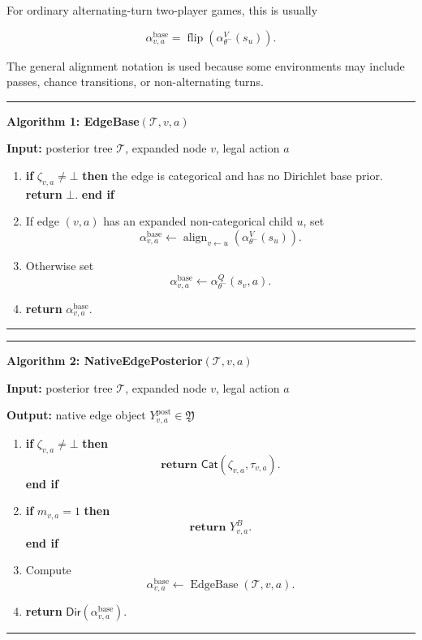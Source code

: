 \documentclass[11pt]{article}
\newcommand{\Tree}{\mathcal{T}}
\newcommand{\Flip}{\operatorname{flip}}
\newcommand{\Align}{\operatorname{align}}
\newcommand{\EdgeBase}{\operatorname{EdgeBase}}
\newcommand{\Native}{\mathfrak{Y}}
\newcommand{\DirObj}{\mathsf{Dir}}
\newcommand{\CatObj}{\mathsf{Cat}}
\newenvironment{algorithmblock}[1]
{
  \par\medskip
  \noindent\hrule\par\smallskip
  \noindent\textbf{#1}
  \par\smallskip
}
{
  \par\smallskip\noindent\hrule\par\medskip
}
\newcommand{\Input}{\textbf{Input: }}
\newcommand{\Output}{\textbf{Output: }}
\newcommand{\Return}{\textbf{return }}
\newcommand{\If}{\textbf{if }}
\newcommand{\Then}{\textbf{ then }}
\newcommand{\EndIf}{\textbf{end if}}
\begin{document}
For ordinary alternating-turn two-player games, this is usually

\[
\alpha^{\mathrm{base}}_{v,a}
=
\Flip
\left(
\alpha_{\theta^-}^V(s_u)
\right).
\]

The general alignment notation is used because some environments may include
passes, chance transitions, or non-alternating turns.

\begin{algorithmblock}{Algorithm 1: EdgeBase\((\Tree,v,a)\)}

\Input posterior tree \(\Tree\), expanded node \(v\), legal action \(a\)

\begin{enumerate}[leftmargin=2em]
  \item \If \(\zeta_{v,a}\ne\bot\) \Then the edge is categorical and has no
  Dirichlet base prior. \Return \(\bot\). \EndIf

  \item If edge \((v,a)\) has an expanded non-categorical child \(u\), set
  \[
  \alpha^{\mathrm{base}}_{v,a}
  \gets
  \Align_{v \leftarrow u}
  \left(
  \alpha_{\theta^-}^V(s_u)
  \right).
  \]

  \item Otherwise set
  \[
  \alpha^{\mathrm{base}}_{v,a}
  \gets
  \alpha_{\theta^-}^Q(s_v,a).
  \]

  \item \Return \(\alpha^{\mathrm{base}}_{v,a}\).
\end{enumerate}

\end{algorithmblock}

\begin{algorithmblock}{Algorithm 2: NativeEdgePosterior\((\Tree,v,a)\)}

\Input posterior tree \(\Tree\), expanded node \(v\), legal action \(a\)

\Output native edge object \(Y^{\mathrm{post}}_{v,a}\in\Native\)

\begin{enumerate}[leftmargin=2em]
  \item \If \(\zeta_{v,a}\ne\bot\) \Then
  \[
  \Return \CatObj(\zeta_{v,a},\tau_{v,a}).
  \]
  \EndIf

  \item \If \(m_{v,a}=1\) \Then
  \[
  \Return Y^B_{v,a}.
  \]
  \EndIf

  \item Compute
  \[
  \alpha^{\mathrm{base}}_{v,a}
  \gets
  \EdgeBase(\Tree,v,a).
  \]

  \item \Return \(\DirObj(\alpha^{\mathrm{base}}_{v,a})\).
\end{enumerate}

\end{algorithmblock}
\end{document}
